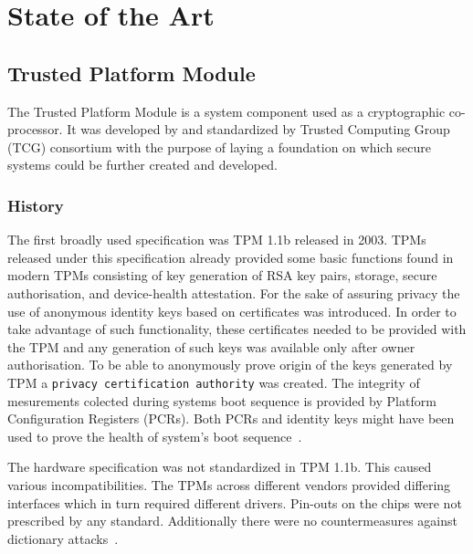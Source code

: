 \chapter{State of the Art}

\section{Trusted Platform Module}
The Trusted Platform Module is a system component used as a cryptographic co-processor. It was developed by and standardized by Trusted Computing Group (TCG) consortium with the purpose of laying a foundation on which secure systems could be further created and developed. 

\subsection{History}
The first broadly used specification was TPM 1.1b released in 2003. TPMs released under this specification already provided some basic functions found in modern TPMs consisting of key generation of RSA key pairs, storage, secure authorisation, and device-health attestation. For the sake of assuring privacy the
use of anonymous identity keys based on certificates was introduced. In order to take advantage of such
functionality, these certificates needed to be provided with the TPM and any generation of such keys was available only after owner authorisation. To be able to anonymously prove origin of the keys generated
by TPM a \texttt{privacy certification authority} was created. The integrity of mesurements colected during systems boot sequence is provided by Platform Configuration Registers (PCRs). Both PCRs and identity keys might have been used to prove the health of system's boot sequence~\cite{arthur2015practical}.


The hardware specification was not standardized in TPM 1.1b. This caused various incompatibilities. The TPMs across different vendors provided differing interfaces which in turn required different drivers. Pin-outs on the chips were not prescribed by any standard. Additionally there were no countermeasures against dictionary attacks~\cite{arthur2015practical}.

